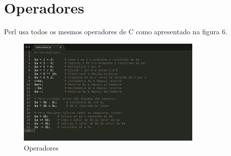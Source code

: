 \chapter{Operadores}
Perl usa todos os mesmos operadores de C como apresentado na figura 6.

\begin{figure}[!htb]
	\centering
	\includegraphics[width=0.8\textwidth]{../5_figuras/image6}
	\caption{Operadores}
\end{figure}

